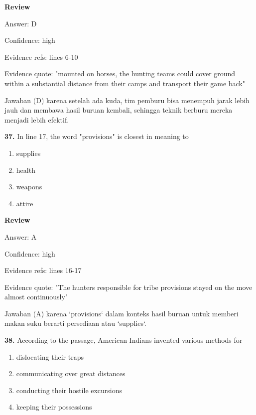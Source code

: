 \documentclass[12pt]{article}
\begin{document}
\par
\begingroup
\setlength{\parskip}{0pt}
\setlength{\parindent}{0pt}
\textbf{Review}\par
Answer: D\par
Confidence: high\par
Evidence refs: lines 6-10\par
Evidence quote: "mounted on horses, the hunting teams could cover ground within a substantial distance from their camps and transport their game back"\par
Jawaban (D) karena setelah ada kuda, tim pemburu bisa menempuh jarak lebih jauh dan membawa hasil buruan kembali, sehingga teknik berburu mereka menjadi lebih efektif.\par
\endgroup
\par
\vspace{0.25\baselineskip}
\noindent\textbf{37.} In line 17, the word "provisions" is closest in meaning to
\begin{enumerate}[label=(\Alph*),leftmargin=*,itemsep=0.2em]
\item supplies
\item health
\item weapons
\item attire
\end{enumerate}
\par
\begingroup
\setlength{\parskip}{0pt}
\setlength{\parindent}{0pt}
\textbf{Review}\par
Answer: A\par
Confidence: high\par
Evidence refs: lines 16-17\par
Evidence quote: "The hunters responsible for tribe provisions stayed on the move almost continuously"\par
Jawaban (A) karena `provisions` dalam konteks hasil buruan untuk memberi makan suku berarti persediaan atau `supplies`.\par
\endgroup
\par
\vspace{0.25\baselineskip}
\noindent\textbf{38.} According to the passage, American Indians invented various methods for
\begin{enumerate}[label=(\Alph*),leftmargin=*,itemsep=0.2em]
\item dislocating their traps
\item communicating over great distances
\item conducting their hostile excursions
\item keeping their possessions
\end{enumerate}
\end{document}
